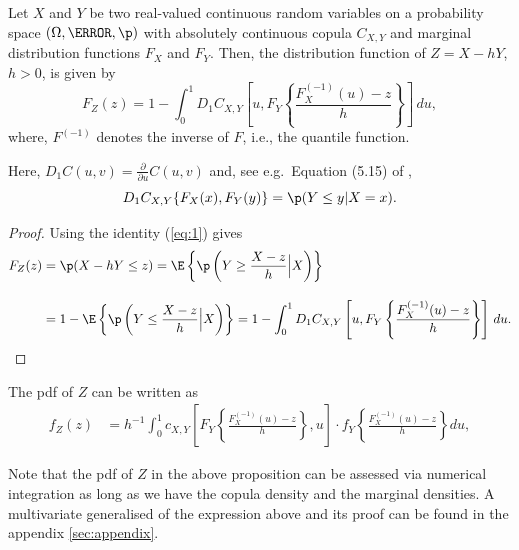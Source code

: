 \begin{proposition}
  \label{prop:dfrh}
  Let $X$ and $Y$ be two real-valued continuous random
  variables on a
  probability space $(\Omega, \F, \p)$ with
  absolutely continuous copula $C_{X, Y}$ and marginal distribution functions $F_{X}$
  and $F_{Y}$. Then, the distribution function of $Z=X-hY$, $h >0$,  is given by
  \begin{equation}
    \label{eq:3}
    F_{Z}(z) = 1- \int^1_0 D_1 C_{X, Y}
    \left[ u, F_{Y} \left\{ \frac{F^{(-1)}_{X}(u)-z}{h} \right\}
    \right]\, d u,   
  \end{equation}
  where, $F^{(-1)}$ denotes the inverse of $F$, i.e., the quantile
function.
\end{proposition}
Here, $D_1 C(u,v)=\displaystyle \frac{\partial}{\partial u}
C(u,v)$ and, see e.g.\ Equation (5.15) of \citep{McNeil2005},
\begin{equation}
  \label{eq:1}
  D_1 C_{X,Y}\{F_X(x), F_Y(y)\} = \p(Y\leq y|X=x).
\end{equation}
\begin{proof}
  Using the identity (\ref{eq:1}) gives
  \begin{align*}
    F_{Z}(z) &= \p(X - h Y\leq z) %
                 = \E\left\{\p\left(Y\geq \frac{X-z}{h}\Big|
                 X\right)\right\}\\[10pt]
               &= 1-\E\left\{\p\left(Y\leq \frac{X-z}{h}\Big|
                 X\right)\right\}%
               = 1- \int_0^1 D_1 C_{X, Y}\left[u,
                 F_{Y}\left\{\frac{F^{(-1)}_{X}(u) -
                 z}{h}\right\}\right]\, d u.
  \end{align*}
  \end{proof}


\begin{corollary} The pdf of $Z$ can be written as
  \begin{align}
  f_{Z}(z) &= h^{-1}\int_0^1 c_{X, Y} \left[
  F_{Y}\left\{\frac{F^{(-1)}_{X}(u)-z}{h}\right\}, u
  \right]
   \cdot
  f_{Y}
  \left\{\frac{F^{(-1)}_{X}(u)-z}{h}\right\} du, \label{eq:density1}
  \end{align}
  \end{corollary}
Note that the pdf of $Z$ in the above proposition can be assessed via numerical integration
as long as we have the copula density and the marginal
densities.
A multivariate generalised of the expression above and its proof can be found in the
appendix \ref{sec:appendix}.

